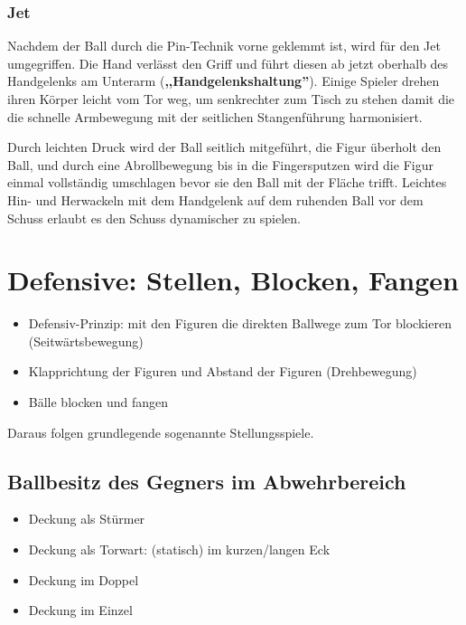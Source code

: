 \subsubsection{Jet}
\label{technik:offensive:schiessen:jet}
Nachdem der Ball durch die Pin-Technik vorne geklemmt ist, wird für den Jet umgegriffen.
Die Hand verlässt den Griff und führt diesen ab jetzt oberhalb des Handgelenks am Unterarm (\textbf{,,Handgelenkshaltung''}).
Einige Spieler drehen ihren Körper leicht vom Tor weg, um senkrechter zum Tisch zu stehen damit die die schnelle Armbewegung mit der seitlichen Stangenführung harmonisiert.

Durch leichten Druck wird der Ball seitlich mitgeführt, die Figur überholt den Ball, und durch eine Abrollbewegung bis in die Fingersputzen wird die Figur einmal vollständig umschlagen bevor sie den Ball mit der Fläche trifft.
Leichtes Hin- und Herwackeln mit dem Handgelenk auf dem ruhenden Ball vor dem Schuss erlaubt es den Schuss dynamischer zu spielen.


\section{Defensive: Stellen, Blocken, Fangen}
\label{technik:defensive}



\begin{itemize}
\item Defensiv-Prinzip: mit den Figuren die direkten Ballwege zum Tor blockieren (Seitwärtsbewegung)  
\item Klapprichtung der Figuren und Abstand der Figuren (Drehbewegung)
\item Bälle blocken und fangen
\end{itemize}
Daraus folgen grundlegende sogenannte Stellungsspiele.


\subsection{Ballbesitz des Gegners im Abwehrbereich}
\label{technik:defensive:gegnerabwehr}

\begin{itemize}
\item Deckung als Stürmer
\item Deckung als Torwart: (statisch) im kurzen/langen Eck
\item Deckung im Doppel
\item Deckung im Einzel
\end{itemize}


